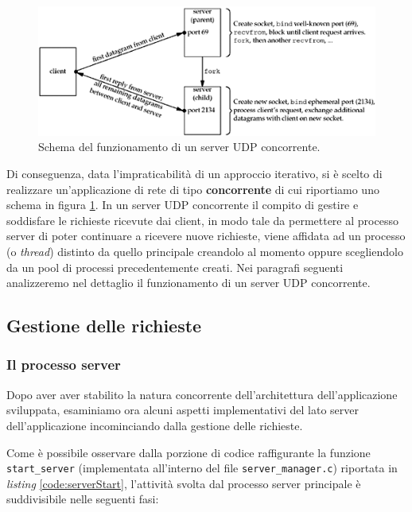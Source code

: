 \documentclass[10pt,a4paper, titlepage]{report}
\begin{document}
\begin{figure}
\centering
\includegraphics[width=\textwidth]{Concorrente}
\caption{Schema del funzionamento di un server UDP concorrente.}
\label{fig:Concorrente}
\end{figure}

Di conseguenza, data l'impraticabilità di un approccio iterativo, si è scelto di realizzare un'applicazione di rete di tipo \textbf{concorrente} di cui riportiamo uno schema in figura \ref{fig:Concorrente}. In un server UDP concorrente il compito di gestire e soddisfare le richieste ricevute dai client, in modo tale da permettere al processo server di poter continuare a ricevere nuove richieste, viene affidata ad un processo (o \textit{thread}) distinto da quello principale creandolo al momento oppure scegliendolo da un pool di processi precedentemente creati. Nei paragrafi seguenti analizzeremo nel dettaglio il funzionamento di un server UDP concorrente.


\subsection{Gestione delle richieste}
\subsubsection{Il processo server}\label{subsubsec:server}

Dopo aver aver stabilito la natura concorrente dell'architettura dell'applicazione sviluppata, esaminiamo ora alcuni aspetti implementativi del lato server dell'applicazione incominciando dalla gestione delle richieste.

Come è possibile osservare dalla porzione di codice raffigurante la funzione \texttt{start\_server} (implementata all'interno del file \texttt{server\_manager.c}) riportata in \textit{listing} \ref{code:serverStart}, l'attività svolta dal processo server principale è suddivisibile nelle seguenti fasi:
\end{document}
